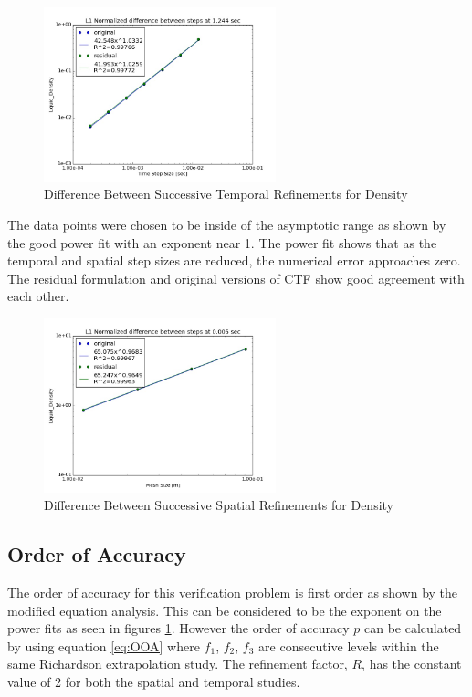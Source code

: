 \documentclass{mc2015}
\begin{document}
\begin{figure}[!h]
	\centering
	\includegraphics[width=0.60\textwidth]{images/Temporal_Study/Difference_rho}
	\caption{Difference Between Successive Temporal Refinements for Density}
	\label{fig:Temporal:Diff_rho}
\end{figure} 

The data points were chosen to be inside of the asymptotic range as shown by
the good power fit with an exponent near 1. The power fit shows that as the
temporal and spatial step sizes are reduced, the numerical error approaches
zero. The residual formulation and original versions of CTF show good agreement
with each other.

\begin{figure}[!h]
	\centering
	\includegraphics[width=0.60\textwidth]{images/Spatial_Study/Difference_rho}
	\caption{Difference Between Successive Spatial Refinements for Density}
	\label{fig:Spatial:Diff_rho}
\end{figure} 

\subsection{Order of Accuracy}

The order of accuracy for this verification problem is first order as shown by
the modified equation analysis. This can be considered to be the exponent on
the power fits as seen in figures \ref{fig:Temporal:Diff_rho}. However the order
of accuracy $p$ can be calculated by using equation \ref{eq:OOA} where $f_{1}$,
$f_{2}$, $f_{3}$ are consecutive levels within the same Richardson extrapolation
study. The refinement factor, $R$, has the constant value of 2 for both the
spatial and temporal studies.
\end{document}
